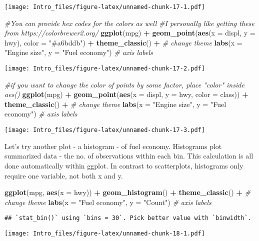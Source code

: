 \documentclass[
]{article}
\newenvironment{Shaded}{\begin{snugshade}}{\end{snugshade}}
\newcommand{\AttributeTok}[1]{\textcolor[rgb]{0.13,0.29,0.53}{#1}}
\newcommand{\CommentTok}[1]{\textcolor[rgb]{0.56,0.35,0.01}{\textit{#1}}}
\newcommand{\FunctionTok}[1]{\textcolor[rgb]{0.13,0.29,0.53}{\textbf{#1}}}
\newcommand{\NormalTok}[1]{#1}
\newcommand{\SpecialCharTok}[1]{\textcolor[rgb]{0.81,0.36,0.00}{\textbf{#1}}}
\newcommand{\StringTok}[1]{\textcolor[rgb]{0.31,0.60,0.02}{#1}}
\begin{document}
\texttt{[image: Intro\_files/figure-latex/unnamed-chunk-17-1.pdf]}

\begin{Shaded}
\begin{Highlighting}[]
\CommentTok{\#You can provide hex codes for the colors as well}
\CommentTok{\#I personally like getting these from https://colorbrewer2.org/}
\FunctionTok{ggplot}\NormalTok{(mpg) }\SpecialCharTok{+} 
  \FunctionTok{geom\_point}\NormalTok{(}\FunctionTok{aes}\NormalTok{(}\AttributeTok{x =}\NormalTok{ displ, }\AttributeTok{y =}\NormalTok{ hwy), }
             \AttributeTok{color =} \StringTok{"\#a6bddb"}\NormalTok{) }\SpecialCharTok{+} 
  \FunctionTok{theme\_classic}\NormalTok{() }\SpecialCharTok{+} \CommentTok{\# change theme}
  \FunctionTok{labs}\NormalTok{(}\AttributeTok{x =} \StringTok{"Engine size"}\NormalTok{, }\AttributeTok{y =} \StringTok{"Fuel economy"}\NormalTok{) }\CommentTok{\# axis labels}
\end{Highlighting}
\end{Shaded}

\texttt{[image: Intro\_files/figure-latex/unnamed-chunk-17-2.pdf]}

\begin{Shaded}
\begin{Highlighting}[]
\CommentTok{\#if you want to change the color of points by some factor, place "color" inside aes()}
\FunctionTok{ggplot}\NormalTok{(mpg) }\SpecialCharTok{+} 
  \FunctionTok{geom\_point}\NormalTok{(}\FunctionTok{aes}\NormalTok{(}\AttributeTok{x =}\NormalTok{ displ, }\AttributeTok{y =}\NormalTok{ hwy, }\AttributeTok{color =}\NormalTok{ class)) }\SpecialCharTok{+} 
  \FunctionTok{theme\_classic}\NormalTok{() }\SpecialCharTok{+} \CommentTok{\# change theme}
  \FunctionTok{labs}\NormalTok{(}\AttributeTok{x =} \StringTok{"Engine size"}\NormalTok{, }\AttributeTok{y =} \StringTok{"Fuel economy"}\NormalTok{) }\CommentTok{\# axis labels}
\end{Highlighting}
\end{Shaded}

\texttt{[image: Intro\_files/figure-latex/unnamed-chunk-17-3.pdf]}

Let's try another plot - a histogram - of fuel economy. Histograms plot
summarized data - the no. of observations within each bin. This
calculation is all done automatically within ggplot. In contrast to
scatterplots, histograms only require one variable, not both x and y.

\begin{Shaded}
\begin{Highlighting}[]
\FunctionTok{ggplot}\NormalTok{(mpg, }\FunctionTok{aes}\NormalTok{(}\AttributeTok{x =}\NormalTok{ hwy)) }\SpecialCharTok{+} 
  \FunctionTok{geom\_histogram}\NormalTok{() }\SpecialCharTok{+} 
  \FunctionTok{theme\_classic}\NormalTok{() }\SpecialCharTok{+} \CommentTok{\# change theme}
  \FunctionTok{labs}\NormalTok{(}\AttributeTok{x =} \StringTok{"Fuel economy"}\NormalTok{, }\AttributeTok{y =} \StringTok{"Count"}\NormalTok{) }\CommentTok{\# axis labels}
\end{Highlighting}
\end{Shaded}

\begin{verbatim}
## `stat_bin()` using `bins = 30`. Pick better value with `binwidth`.
\end{verbatim}

\texttt{[image: Intro\_files/figure-latex/unnamed-chunk-18-1.pdf]}
\end{document}
